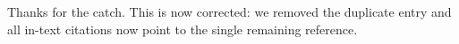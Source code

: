 
Thanks for the catch. This is now corrected: we removed the duplicate entry and all in-text citations now point to the single remaining reference.

